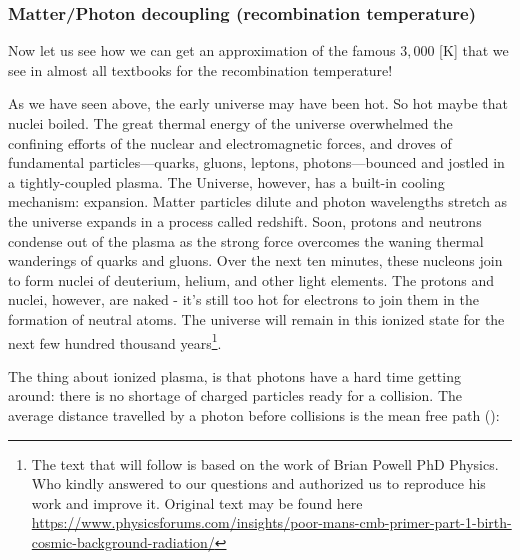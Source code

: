 	\subsubsection{Matter/Photon decoupling (recombination temperature)}\label{Cosmological Microwave Background decoupling}
	Now let us see how we can get an approximation of the famous $3,000$ [K] that we see in almost all textbooks for the recombination temperature!
	
	As we have seen above, the early universe may have been hot. So hot maybe that nuclei boiled. The great thermal energy of the universe overwhelmed the confining efforts of the nuclear and electromagnetic forces, and droves of fundamental particles—quarks, gluons, leptons, photons—bounced and jostled in a tightly-coupled plasma. The Universe, however, has a built-in cooling mechanism: expansion. Matter particles dilute and photon wavelengths stretch as the universe expands in a process called redshift. Soon, protons and neutrons condense out of the plasma as the strong force overcomes the waning thermal wanderings of quarks and gluons. Over the next ten minutes, these nucleons join to form nuclei of deuterium, helium, and other light elements. The protons and nuclei, however, are naked - it's still too hot for electrons to join them in the formation of neutral atoms. The universe will remain in this ionized state for the next few hundred thousand years\footnote{The text that will follow is based on the work of Brian Powell PhD Physics. Who kindly answered to our questions and authorized us to reproduce his work and improve it. Original text may be found here \url{https://www.physicsforums.com/insights/poor-mans-cmb-primer-part-1-birth-cosmic-background-radiation/}}.
	
	The thing about ionized plasma, is that photons have a hard time getting around: there is no shortage of charged particles ready for a collision. The average distance travelled by a photon before collisions is the mean free path ():
	
